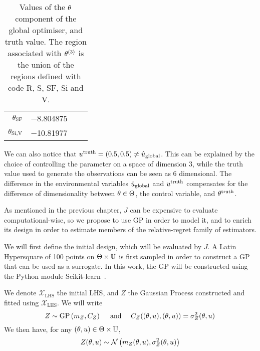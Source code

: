 \documentclass[../../Main_ManuscritThese.tex]{subfiles}
\begin{document}
\begin{table}[!h]
\begin{tabular}{rrrr}
    $\theta_{\mathrm{SF}}$   & \num[round-mode=places,round-precision=4]{-8.804875}                                                                                                                                                                                                                                        &                          &                                                                         \\
    $\theta_{\mathrm{Si,V}}$ & \num[round-mode=places,round-precision=4]{-10.81977}                                                                                                                                                                                                                                        &                          &                                                                         \\ \bottomrule
  \end{tabular}
  \caption[Values of the $\kk$ component of the global optimiser, and
  truth value]{\label{tab:ktruthkopt} Values of the $\kk$ component of
    the global optimiser, and truth value. The region associated with
    $\theta^{(3)}$ is the union of the regions defined with code R, S,
    SF, Si and V.}
\end{table}
We can also notice that
$u^{\mathrm{truth}}=(\num{0.5},\num{0.5}) \neq
\hat{u}_{\mathrm{global}}$. This can be explained by the choice of
controlling the parameter on a space of dimension 3, while the truth
value used to generate the observations can be seen as 6
dimensional. The difference in the environmental variables $\hat{u}_{\mathrm{global}}$ and
$u^{\mathrm{truth}}$ compensates for the
difference of dimensionality between $\theta\in\Theta$, the control
variable, and $\theta^{\mathrm{truth}}$.

As mentioned in the previous chapter, $J$ can be expensive to evaluate
computational-wise, so we propose to use GP in order to model it, and
to enrich its design in order to estimate members of the
relative-regret family of estimators.

We will first define the initial design, which will be evaluated by
$J$. A Latin Hypersquare of \num{100} points on
$\Theta \times \mathbb{U}$ is first sampled in order to construct a GP
that can be used as a surrogate.  In this work, the GP will be
constructed using the Python module
Scikit-learn~\citep{pedregosa_scikit-learn_2011}.

We denote $\mathcal{X}_{\mathrm{LHS}}$ the initial LHS, and $Z$ the
Gaussian Process constructed and fitted using
$\mathcal{X}_{\mathrm{LHS}}$.  We will write
\begin{equation}
  Z \sim \operatorname{\mathrm{GP}}\left(m_Z, C_Z\right) \quad\text{ and } \quad C_Z((\theta, u),(\theta, u)) = \sigma^2_Z(\theta, u)
\end{equation}
We then have, for any $(\theta, u) \in \Theta\times\mathbb{U}$,
\begin{equation}
  Z(\theta, u) \sim \mathcal{N}\left(m_Z(\theta, u), \sigma^2_Z(\theta, u)\right)
\end{equation}
\end{document}
